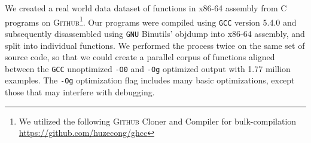 \documentclass{article}
\newcommand{\GH}{\textsc{Github}}
\begin{document}






We created a real world data dataset of functions in x86-64 assembly from C programs on \GH \footnote{We utilized the following \GH{}  Cloner and Compiler for bulk-compilation \url{https://github.com/huzecong/ghcc}}. Our programs were compiled using \texttt{GCC} version 5.4.0 and subsequently disassembled using \texttt{GNU} Binutils’ objdump into x86-64 assembly, and split into individual functions. We performed the process twice on the same set of source code, so that we could create a parallel corpus of functions aligned between the \texttt{GCC} unoptimized \texttt{-O0} and \texttt{-Og} optimized output with 1.77 million examples. The \texttt{-Og} optimization flag includes many basic optimizations, except those that may interfere with debugging. 
\end{document}
